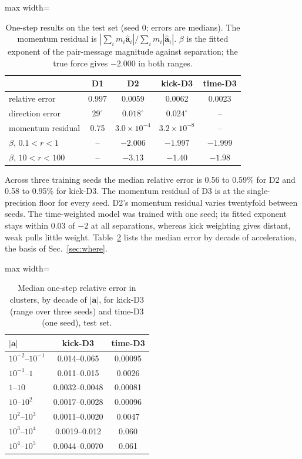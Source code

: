 \documentclass[a4paper,journal]{IEEEtran}
\newcommand{\vect}[1]{\mathbf{#1}}
\begin{document}
\begin{table}[H]
\caption{One-step results on the test set (seed 0; errors are medians). The momentum residual is $|\sum_im_i\hat{\vect a}_i|/\sum_im_i|\hat{\vect a}_i|$. $\beta$ is the fitted exponent of the pair-message magnitude against separation; the true force gives $-2.000$ in both ranges.}
\label{tab:onestep}
\centering
\begin{adjustbox}{max width=\columnwidth}
\begin{tabular}{lcccc}
\toprule
 & D1 & D2 & kick-D3 & time-D3\\
\midrule
relative error & 0.997 & 0.0059 & 0.0062 & 0.0023\\
direction error & $29^\circ$ & $0.018^\circ$ & $0.024^\circ$ & --\\
momentum residual & 0.75 & $3.0{\times}10^{-4}$ & $3.2{\times}10^{-8}$ & --\\
$\beta$, $0.1<r<1$ & -- & $-2.006$ & $-1.997$ & $-1.999$\\
$\beta$, $10<r<100$ & -- & $-3.13$ & $-1.40$ & $-1.98$\\
\bottomrule
\end{tabular}
\end{adjustbox}
\end{table}

Across three training seeds the median relative error is 0.56 to 0.59\% for D2 and 0.58 to 0.95\% for kick-D3. The momentum residual of D3 is at the single-precision floor for every seed. D2's momentum residual varies twentyfold between seeds. The time-weighted model was trained with one seed; its fitted exponent stays within $0.03$ of $-2$ at all separations, whereas kick weighting gives distant, weak pulls little weight. Table~\ref{tab:weighting} lists the median error by decade of acceleration, the basis of Sec.~\ref{sec:where}.

\begin{table}[H]
\caption{Median one-step relative error in clusters, by decade of $|\vect a|$, for kick-D3 (range over three seeds) and time-D3 (one seed), test set.}
\label{tab:weighting}
\centering
\begin{adjustbox}{max width=\columnwidth}
\begin{tabular}{lcc}
\toprule
$|\vect a|$ & kick-D3 & time-D3\\
\midrule
$10^{-2}$--$10^{-1}$ & 0.014--0.065 & 0.00095\\
$10^{-1}$--$1$ & 0.011--0.015 & 0.0026\\
$1$--$10$ & 0.0032--0.0048 & 0.00081\\
$10$--$10^{2}$ & 0.0017--0.0028 & 0.00096\\
$10^{2}$--$10^{3}$ & 0.0011--0.0020 & 0.0047\\
$10^{3}$--$10^{4}$ & 0.0019--0.012 & 0.060\\
$10^{4}$--$10^{5}$ & 0.0044--0.0070 & 0.061\\
\bottomrule
\end{tabular}
\end{adjustbox}
\end{table}
\end{document}
